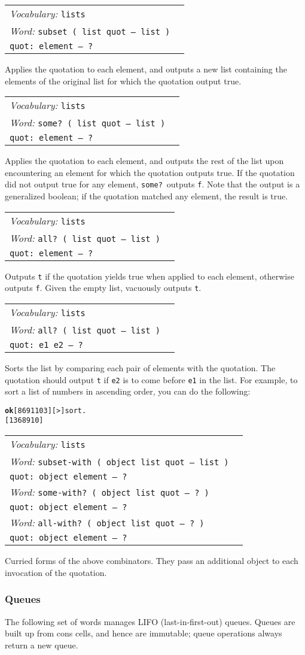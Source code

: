 \documentclass{book}
\newcommand{\vocabulary}[1]{\emph{Vocabulary:} \texttt{#1}&\\}
\newcommand{\ordinaryword}[2]{\index{\texttt{#1}}\emph{Word:} \texttt{#2}&\\}
\newcommand{\wordtable}[1]{


\begin{tabularx}{12cm}{lX}
\hline
#1
\hline
\end{tabularx}

}
\begin{document}
\wordtable{
\vocabulary{lists}
\ordinaryword{subset}{subset ( list quot -- list )}
\texttt{quot:~element -- ?}\\
}
Applies the quotation to each element, and outputs a new list containing the elements of the original list for which the quotation output true.
\wordtable{
\vocabulary{lists}
\ordinaryword{some?}{some?~( list quot -- list )}
\texttt{quot:~element -- ?}\\
}
Applies the quotation to each element, and outputs the rest of the list upon encountering an element for which the quotation outputs true. If the quotation did not output true for any element, \texttt{some?}~outputs \texttt{f}. Note that the output is a generalized boolean; if the quotation matched any element, the result is true.
\wordtable{
\vocabulary{lists}
\ordinaryword{all?}{all?~( list quot -- list )}
\texttt{quot:~element -- ?}\\
}
Outputs \texttt{t} if the quotation yields true when applied to each element, otherwise outputs \texttt{f}. Given the empty list, vacuously outputs \texttt{t}.
\wordtable{
\vocabulary{lists}
\ordinaryword{sort}{all?~( list quot -- list )}
\texttt{quot:~e1 e2 -- ?}\\
}
Sorts the list by comparing each pair of elements with the quotation. The quotation should output \texttt{t} if \texttt{e2} is to come before \texttt{e1} in the list. For example, to sort a list of numbers in ascending order, you can do the following:
\begin{alltt}
\textbf{ok} [ 8 6 9 1 10 3 ] [ > ] sort .
[ 1 3 6 8 9 10 ]
\end{alltt}
\wordtable{
\vocabulary{lists}
\ordinaryword{subset-with}{subset-with ( object list quot -- list )}
\texttt{quot:~object element -- ?}\\
\ordinaryword{some-with?}{some-with?~( object list quot -- ?~)}
\texttt{quot:~object element -- ?}\\
\ordinaryword{all-with?}{all-with?~( object list quot -- ?~)}
\texttt{quot:~object element -- ?}\\
}
Curried forms of the above combinators. They pass an additional object to each invocation of the quotation.

\subsubsection{Queues}

The following set of words manages LIFO (last-in-first-out) queues. Queues are built up from cons cells, and hence are immutable; queue operations always return a new queue.
\end{document}
